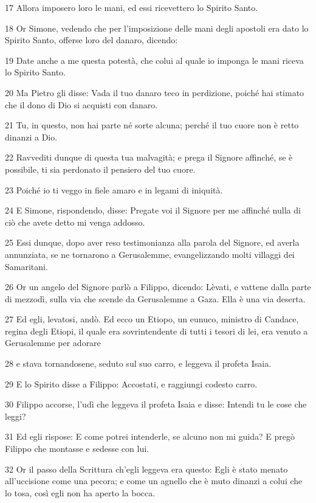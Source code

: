 \par 17 Allora imposero loro le mani, ed essi ricevettero lo Spirito Santo.
\par 18 Or Simone, vedendo che per l'imposizione delle mani degli apostoli era dato lo Spirito Santo, offerse loro del danaro, dicendo:
\par 19 Date anche a me questa potestà, che colui al quale io imponga le mani riceva lo Spirito Santo.
\par 20 Ma Pietro gli disse: Vada il tuo danaro teco in perdizione, poiché hai stimato che il dono di Dio si acquisti con danaro.
\par 21 Tu, in questo, non hai parte né sorte alcuna; perché il tuo cuore non è retto dinanzi a Dio.
\par 22 Ravvediti dunque di questa tua malvagità; e prega il Signore affinché, se è possibile, ti sia perdonato il pensiero del tuo cuore.
\par 23 Poiché io ti veggo in fiele amaro e in legami di iniquità.
\par 24 E Simone, rispondendo, disse: Pregate voi il Signore per me affinché nulla di ciò che avete detto mi venga addosso.
\par 25 Essi dunque, dopo aver reso testimonianza alla parola del Signore, ed averla annunziata, se ne tornarono a Gerusalemme, evangelizzando molti villaggi dei Samaritani.
\par 26 Or un angelo del Signore parlò a Filippo, dicendo: Lèvati, e vattene dalla parte di mezzodì, sulla via che scende da Gerusalemme a Gaza. Ella è una via deserta.
\par 27 Ed egli, levatosi, andò. Ed ecco un Etiopo, un eunuco, ministro di Candace, regina degli Etiopi, il quale era sovrintendente di tutti i tesori di lei, era venuto a Gerusalemme per adorare
\par 28 e stava tornandosene, seduto sul suo carro, e leggeva il profeta Isaia.
\par 29 E lo Spirito disse a Filippo: Accostati, e raggiungi codesto carro.
\par 30 Filippo accorse, l'udì che leggeva il profeta Isaia e disse: Intendi tu le cose che leggi?
\par 31 Ed egli rispose: E come potrei intenderle, se alcuno non mi guida? E pregò Filippo che montasse e sedesse con lui.
\par 32 Or il passo della Scrittura ch'egli leggeva era questo: Egli è stato menato all'uccisione come una pecora; e come un agnello che è muto dinanzi a colui che lo tosa, così egli non ha aperto la bocca.
